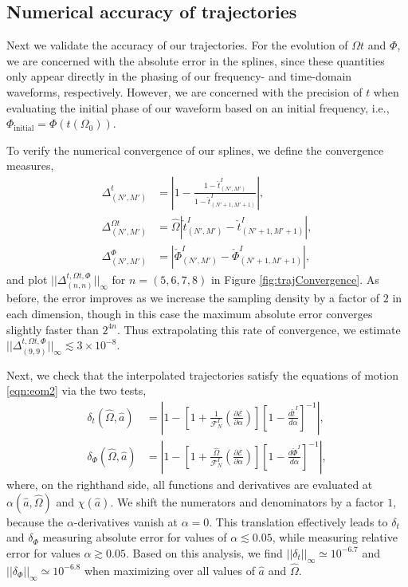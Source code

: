 \documentclass[%
 reprint,
 nofootinbib,
 amsmath,amssymb,
 aps,
 prd,
]{revtex4-2}
\begin{document}
\subsection{Numerical accuracy of trajectories}
\label{app:trajtests}

Next we validate the accuracy of our trajectories. For the evolution of $\Omega t$ and $\Phi$, we are concerned with the absolute error in the splines, since these quantities  only appear directly in the phasing of our frequency- and time-domain waveforms, respectively. However, we are concerned with the precision of $t$ when evaluating the initial phase of our waveform based on an initial frequency, i.e., $\Phi_\mathrm{initial} = \Phi(t(\Omega_0))$.

To verify the numerical convergence of our splines, we define the convergence measures,
\begin{align}
    \Delta^t_{(N',M')} &= \left| 1 - \frac{1-\check{t}^I_{(N',M')}}{1-\check{t}^I_{(N'+1,M'+1)}} \right|,
    \\
    \Delta^{\Omega t}_{(N',M')} &= \hat{\Omega}\left| {\check{t}^I_{(N',M')}} - {\check{t}^I_{(N'+1,M'+1)}} \right|,
    \\
    \Delta^\Phi_{(N',M')} &= \left| {\check{\Phi}^I_{(N',M')}} - {\check{\Phi}^I_{(N'+1,M'+1)}} \right|,
\end{align}
and plot $|| \Delta^{t,\Omega t,\Phi}_{(n,n)}||_\infty$ for $n = (5, 6, 7, 8)$ in Figure \ref{fig:trajConvergence}. As before, the error improves as we increase the sampling density by a factor of $2$ in each dimension, though in this case the maximum absolute error converges slightly faster than $2^{4n}$. Thus extrapolating this rate of convergence, we estimate $|| \Delta^{t,\Omega t,\Phi}_{(9,9)}||_\infty \lesssim 3\times 10^{-8}$. 

Next, we check that the interpolated trajectories satisfy the equations of motion \eqref{eqn:eom2} via the two tests,
\begin{align}
    \delta_{t}(\hat{\Omega}, \hat{a}) &= \left| 1 - \left[1 + \frac{1}{\mathcal{F}^I_N}\left(\frac{\partial\mathcal{E}}{\partial\alpha} \right)\right]\left[1 - \frac{d\check{t}^I}{d\alpha}\right]^{-1}\right|,
    \\
    \delta_{\Phi}(\hat{\Omega}, \hat{a}) &= \left| 1 -  \left[1 + \frac{\hat{\Omega}}{\mathcal{F}^I_N}\left(\frac{\partial\mathcal{E}}{\partial\alpha} \right)\right]\left[1 -\frac{d\check{\Phi}^I}{d{\alpha}} \right]^{-1}\right|,
\end{align}
where, on the righthand side, all functions and derivatives are evaluated at $\alpha(\hat{a},\hat{\Omega})$ and $\chi(\hat{a})$. We shift the numerators and denominators by a factor $1$, because the $\alpha$-derivatives vanish at $\alpha = 0$. This translation effectively leads to $\delta_t$ and $\delta_\Phi$ measuring absolute error for values of $\alpha \lesssim 0.05$, while measuring relative error for values $\alpha \gtrsim 0.05$. Based on this analysis, we find $||\delta_t||_\infty \simeq 10^{-6.7}$ and $||\delta_\Phi||_\infty \simeq 10^{-6.8}$ when maximizing over all values of $\hat{a}$ and $\hat{\Omega}$.
\end{document}
